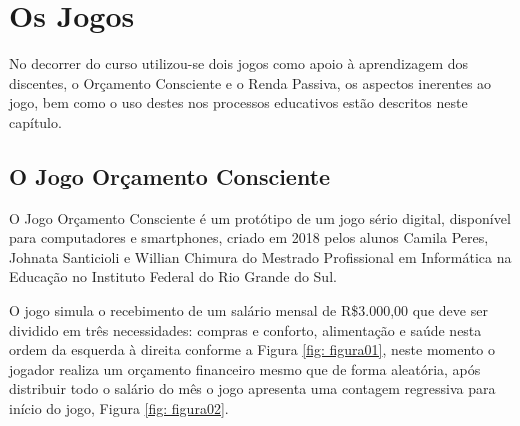 \section{Os Jogos}
No decorrer do curso utilizou-se dois jogos como apoio à aprendizagem dos discentes, o Orçamento Consciente e o Renda Passiva, os aspectos inerentes ao jogo, bem como o uso destes nos processos educativos estão descritos neste capítulo.

\subsection{O Jogo Orçamento Consciente}
O Jogo Orçamento Consciente é um protótipo de um jogo sério digital, disponível para computadores e smartphones, criado em 2018 pelos alunos Camila Peres, Johnata Santicioli e Willian Chimura do Mestrado Profissional em Informática na Educação no Instituto Federal do Rio Grande do Sul.

O jogo simula o recebimento de um salário mensal de R\$3.000,00 que deve ser dividido em três necessidades: compras e conforto, alimentação e saúde nesta ordem da esquerda à direita conforme a Figura \ref{fig: figura01}, neste momento o jogador realiza um orçamento financeiro mesmo que de forma aleatória, após distribuir todo o salário do mês o jogo apresenta uma contagem regressiva para início do jogo, Figura \ref{fig: figura02}.

